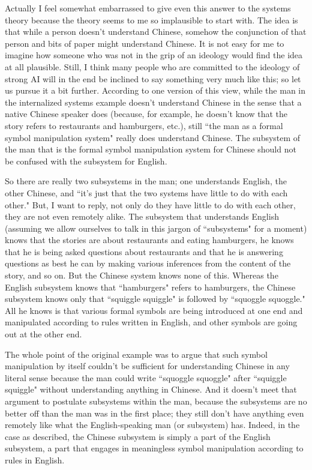 Actually I feel somewhat embarrassed to give even this answer to the systems theory because the theory seems
to me so implausible to start with. The idea is that while a person doesn't understand Chinese, somehow the
conjunction of that person and bits of paper might understand Chinese. It is not easy for me to imagine how
someone who was not in the grip of an ideology would find the idea at all plausible. Still, I think many people
who are committed to the ideology of strong AI will in the end be inclined to say something very much like this;
so let us pursue it a bit further. According to one version of this view, while the man in the internalized systems
example doesn't understand Chinese in the sense that a native Chinese speaker does (because, for example, he
doesn't know that the story refers to restaurants and hamburgers, etc.), still ``the man as a formal symbol
manipulation system" really does understand Chinese. The subsystem of the man that is the formal symbol
manipulation system for Chinese should not be confused with the subsystem for English.

So there are really two subsystems in the man; one understands English, the other Chinese, and ``it's just that the two systems have little to do with each other." But, I want to reply, not only do they have little to do with each other, they are not even remotely alike. The subsystem that understands English (assuming we allow ourselves
to talk in this jargon of ``subsystems" for a moment) knows that the stories are about restaurants and eating
hamburgers, he knows that he is being asked questions about restaurants and that he is answering questions as
best he can by making various inferences from the content of the story, and so on. But the Chinese system
knows none of this. Whereas the English subsystem knows that ``hamburgers" refers to hamburgers, the Chinese
subsystem knows only that ``squiggle squiggle" is followed by ``squoggle squoggle." All he knows is that various
formal symbols are being introduced at one end and manipulated according to rules written in English, and other
symbols are going out at the other end.

The whole point of the original example was to argue that such symbol manipulation by itself couldn't be
sufficient for understanding Chinese in any literal sense because the man could write ``squoggle squoggle" after
``squiggle squiggle" without understanding anything in Chinese. And it doesn't meet that argument to postulate
subsystems within the man, because the subsystems are no better off than the man was in the first place; they
still don't have anything even remotely like what the English-speaking man (or subsystem) has. Indeed, in the
case as described, the Chinese subsystem is simply a part of the English subsystem, a part that engages in
meaningless symbol manipulation according to rules in English.

